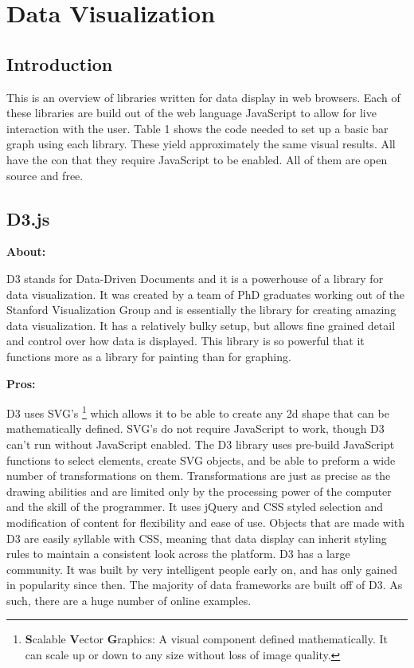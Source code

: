 \documentclass[draftclsnofoot,onecolumn,letterpaper,10pt,compsoc]{IEEEtran}
\begin{document}
\section{Data Visualization}
  \subsection{Introduction}
  This is an overview of libraries written for data display in web browsers.
  Each of these libraries are build out of the web language JavaScript to allow for live interaction with the user.
  Table 1 shows the code needed to set up a basic bar graph using each library.
  These yield approximately the same visual results.
  All have the con that they require JavaScript to be enabled.
  All of them are open source and free.

  \subsection{D3.js}
  \textbf{About:}

  D3 stands for Data-Driven Documents and it is a powerhouse of a library for data visualization.
  It was created by a team of PhD graduates working out of the Stanford Visualization Group and is essentially the library for creating amazing data visualization.
  It has a relatively bulky setup, but allows fine grained detail and control over how data is displayed.
  This library is so powerful that it functions more as a library for painting than for graphing.

  \textbf{Pros:}

  D3 uses SVG's \footnote{\textbf{S}calable \textbf{V}ector \textbf{G}raphics: A visual component defined mathematically. It can scale up or down to any size without loss of image quality.} which allows it to be able to create any 2d shape that can be mathematically defined.
  SVG's do not require JavaScript to work, though D3 can't run without JavaScript enabled.
  The D3 library uses pre-build JavaScript functions to select elements, create SVG objects, and be able to preform a wide number of transformations on them.
  Transformations are just as precise as the drawing abilities and are limited only by the processing power of the computer and the skill of the programmer.
  It uses jQuery and CSS styled selection and modification of content for flexibility and ease of use.
  Objects that are made with D3 are easily syllable with CSS, meaning that data display can inherit styling rules to maintain a consistent look across the platform.
  D3 has a large community.
  It was built by very intelligent people early on, and has only gained in popularity since then.
  The majority of data frameworks are built off of D3.
  As such, there are a huge number of online examples.
\end{document}
